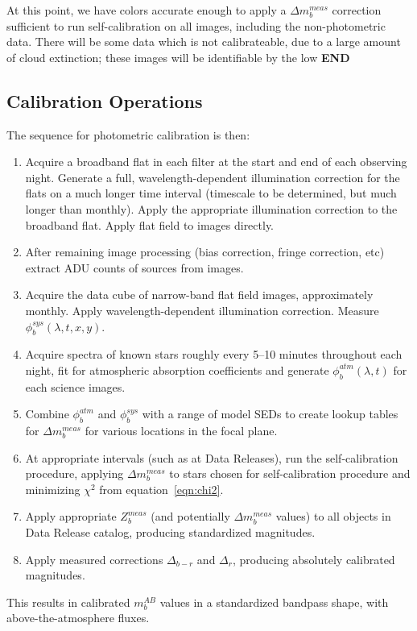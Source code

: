 \documentclass[12pt,preprint]{aastex}
\begin{document}
At this point, we have colors accurate enough to apply a $\Delta
m_b^{meas}$ correction sufficient to run self-calibration on all
images, including the non-photometric data.  There will be some data
which is not calibrateable, due to a large amount of cloud
extinction; these images will be identifiable by the low
{\bf END}

\subsection{Calibration Operations}
The sequence for photometric calibration is then:
\begin{enumerate}
\item{Acquire a broadband flat in each filter at the start and end
of each observing night. Generate a full, wavelength-dependent
illumination correction for the flats on a much longer time interval
(timescale to be determined, but much longer than monthly). Apply
the appropriate illumination correction to the broadband flat. Apply
flat field to images directly.}
\item{After remaining image processing (bias correction, fringe
correction, etc) extract ADU counts of sources from images. }
\item{Acquire the data cube of narrow-band flat field images,
approximately monthly. Apply wavelength-dependent illumination
correction. Measure $\phi_b^{sys}(\lambda,t,x,y)$. }
\item{Acquire spectra of known stars roughly every 5--10 minutes
throughout each night, fit for atmospheric absorption coefficients and
generate $\phi_b^{atm}(\lambda,t)$ for each science images. }
\item{Combine $\phi_b^{atm}$ and $\phi_b^{sys}$ with a range of model
SEDs to create lookup tables for $\Delta m_b^{meas}$ for various
locations in the focal plane. }
\item{At appropriate intervals (such as at Data Releases), run the
self-calibration procedure, applying $\Delta m_b^{meas}$ to stars
chosen for self-calibration procedure and minimizing $\chi^2$ from
equation~\ref{eqn:chi2}.}
\item{Apply appropriate $Z_b^{meas}$ (and potentially $\Delta
m_b^{meas}$ values) to all objects in Data Release catalog, producing
standardized magnitudes.}
\item{Apply measured corrections $\Delta_{b-r}$ and $\Delta_r$,
producing absolutely calibrated magnitudes.}
\end{enumerate}
This results in calibrated $m_b^{AB}$ values in a standardized
bandpass shape, with above-the-atmosphere fluxes.
\end{document}
